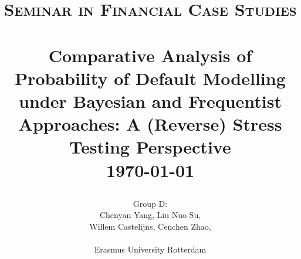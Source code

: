 \documentclass[11pt]{article}
\begin{document}
\begin{titlepage}

\title{     

\normalsize \textsc{Seminar in Financial Case Studies}
		\\ [2.0cm]
		 \\
		\LARGE \textbf{Comparative Analysis of Probability of Default Modelling under Bayesian and Frequentist Approaches: A (Reverse) Stress Testing Perspective} %
		\\ [0.5cm]
		\normalsize \today \vspace*{5\baselineskip}}

\date{}

\author{    
		Group D: \\
		Chenyan Yang, Liu Nuo Su, \\
		Willem Castelijns, Cenchen Zhao, \\ 
		\\ 
		Erasmus University Rotterdam \\ [5.0cm]
		}

\maketitle

\thispagestyle{empty}
\end{titlepage}


\maketitle

\tableofcontents

\pagebreak





%
%






\newpage


\newpage
%
\end{document}
